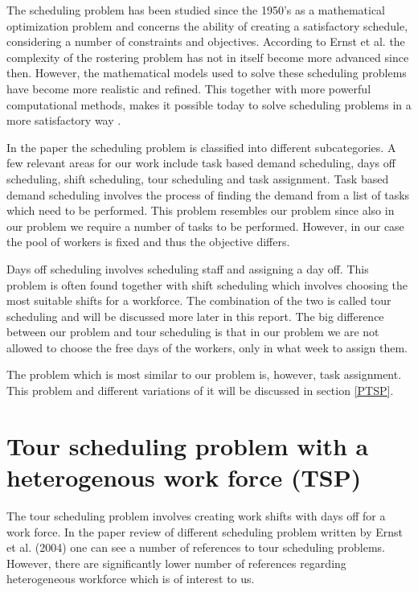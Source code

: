
The scheduling problem has been studied since the 1950's as a mathematical optimization problem and concerns the ability of creating a satisfactory schedule, considering a number of constraints and objectives. According to Ernst et al. the complexity of the rostering problem has not in itself become more advanced since then. However, the mathematical models used to solve these scheduling problems have become more realistic and refined. This together with more powerful computational methods, makes it possible today to solve scheduling problems in a more satisfactory way \cite{Ernst_2004}.

In the paper \cite{Ernst_2004} the scheduling problem is classified into different subcategories. A few relevant areas for our work include task based demand scheduling, days off scheduling, shift scheduling, tour scheduling and task assignment. Task based demand scheduling involves the process of finding the demand from a list of tasks which need to be performed. This problem resembles our problem since also in our problem we require a number of tasks to be performed. However, in our case the pool of workers is fixed and thus the objective differs. 
	
Days off scheduling involves scheduling staff and assigning a day off. This problem is often found together with shift scheduling which involves choosing the most suitable shifts for a workforce. The combination of the two is called tour scheduling and will be discussed more later in this report. The big difference between our problem and tour scheduling is that in our problem we are not allowed to choose the free days of the workers, only in what week to assign them.

The problem which is most similar to our problem is, however, task assignment. This problem and different variations of it will be discussed in section \ref{PTSP}.

\iffalse
 (The Use of Mathematical Models in Plant Maintenance Decision Making, 1967) In surveys such as "An Annotated Bibliography of Personnel Scheduling
and Rostering" Ernst et al. 2004,  covers papers from 1954. The bibliography covers the most important contributions to the area of scheduling up to the year 2004 and divides the area into different subcategories. Below, we have identified the most relevant areas of scheduling in relation to the problem at hand.
\fi

\section{Tour scheduling problem with a heterogenous work force (TSP)}\label{TSP}
The tour scheduling problem involves creating work shifts with days off for a work force. 
In the paper review of different scheduling problem written by Ernst et al. (2004) one can see a number of references to tour scheduling problems. However, there are significantly lower number of references regarding heterogeneous workforce which is of interest to us.

